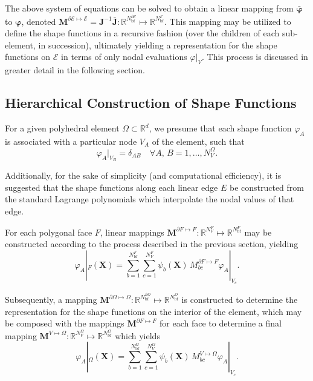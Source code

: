 	The above system of equations can be solved to obtain a linear mapping from $\bar{\boldsymbol{\varphi}}$ to $\boldsymbol{\varphi}$, denoted $\bm{M}^{\partial \mathcal{E} \mapsto \mathcal{E}} = \bm{J}^{-1} \bar{\bm{J}} : \mathbb{R}^{N^{\partial \mathcal{E}}_{\mathrm b\mathrm f}} \mapsto \mathbb{R}^{N^{\mathcal{E}}_{\mathrm b\mathrm f}}$. This mapping may be utilized to define the shape functions in a recursive fashion (over the children of each sub-element, in succession), ultimately yielding a representation for the shape functions on $\mathcal{E}$ in terms of only nodal evaluations $\varphi|_{V}$. This process is discussed in greater detail in the following section.
	
\subsection*{Hierarchical Construction of Shape Functions}

	For a given polyhedral element $\Omega \subset \mathbb{R}^d$, we presume that each shape function $\varphi_A$ is associated with a particular node $V_A$ of the element, such that
	\begin{equation}
		\varphi_A |_{V_B} = \delta_{AB} \quad \forall A, \, B = 1, \ldots, N^{\Omega}_V.
	\end{equation}
	
	Additionally, for the sake of simplicity (and computational efficiency), it is suggested that the shape functions along each linear edge $E$ be constructed from the standard Lagrange polynomials which interpolate the nodal values of that edge.

	For each polygonal face $F$, linear mappings $\bm{M}^{\partial F \mapsto F} : \mathbb{R}^{N^{F}_{V}} \mapsto \mathbb{R}^{N^{F}_{\mathrm b\mathrm f}}$ may be constructed according to the process described in the previous section, yielding 
	\begin{equation}
		\varphi_A |_{F} (\bm{X}) = \sum_{b = 1}^{N^F_{\mathrm b\mathrm f}} \sum_{c = 1}^{N^F_{V}} \psi_b (\bm{X}) \, M^{\partial F \mapsto F}_{bc} \varphi_A |_{V_c}.
	\end{equation}

	Subsequently, a mapping $\bm{M}^{\partial \Omega \mapsto \Omega} : \mathbb{R}^{N^{\partial \Omega}_{\mathrm b\mathrm f}} \mapsto \mathbb{R}^{N^{\Omega}_{\mathrm b\mathrm f}}$ is constructed to determine the representation for the shape functions on the interior of the element, which may be composed with the mappings $\bm{M}^{\partial F \mapsto F}$ for each face to determine a final mapping $\bm{M}^{V \mapsto \Omega} : \mathbb{R}^{N^{\Omega}_{V}} \mapsto \mathbb{R}^{N^{\Omega}_{\mathrm b\mathrm f}}$ which yields
	\begin{equation}
		\varphi_A |_{\Omega} (\bm{X}) = \sum_{b = 1}^{N^\Omega_{\mathrm b\mathrm f}} \sum_{c = 1}^{N^\Omega_{V}} \psi_b (\bm{X}) \, M^{V \mapsto \Omega}_{bc} \varphi_A |_{V_c}.
		\label{eq:mapped_shape_functions}
	\end{equation}

